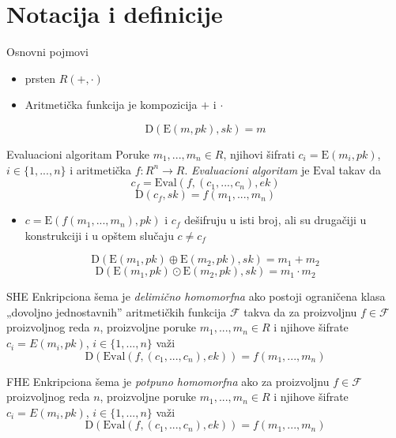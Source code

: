 \documentclass[aspectratio=1610]{beamer}
\begin{document}
\section{Notacija i definicije}
\begin{frame}{Osnovni pojmovi}
    \begin{itemize}
        \item prsten $R(+, \cdot)$
        \item Aritmeti\v cka funkcija je kompozicija $+$ i $\cdot$
    \end{itemize}
    $$\mathrm{D}(\mathrm{E}(m, pk), sk) = m $$
    \begin{pblock}{Evaluacioni algoritam}
        Poruke $m_1, ..., m_n\in R$, njihovi \v sifrati $c_i = \mathrm{E}(m_i, pk)$, $i\in \{1, ..., n\}$ i aritmeti\v cka $f:R^n\rightarrow R$. \textit{Evaluacioni algoritam} je $\mathrm{Eval}$ takav da
        $$c_f = \mathrm{Eval}(f, (c_1, ..., c_n), ek)$$
        $$\mathrm{D}(c_f, sk) = f(m_1, ..., m_n)$$
    \end{pblock}
    \begin{itemize}
        \item $c = \mathrm{E}(f (m_1 , ..., m_n ), pk)$ i $c_f$ dešifruju u isti broj, ali su drugačiji u konstrukciji i u opštem slučaju $c \neq c_f$
    \end{itemize}
\end{frame}

\begin{frame}
    $$\mathrm{D}(\mathrm{E}(m_1, pk) \oplus \mathrm{E}(m_2, pk), sk) = m_1 + m_2$$
    $$\mathrm{D}(\mathrm{E}(m_1, pk) \odot \mathrm{E}(m_2, pk), sk) = m_1 \cdot m_2$$
    \begin{pblock}{SHE}
        Enkripciona \v sema je \textit{delimi\v cno homomorfna} ako postoji ograni\v cena klasa „dovoljno jednostavnih” aritmeti\v ckih funkcija $\mathcal{F}$ takva da za proizvoljnu $f\in \mathcal{F}$ proizvoljnog reda $n$, proizvoljne poruke $m_1, ..., m_n\in R$ i njihove \v sifrate $c_i = E(m_i, pk)$, $i\in \{1, ..., n\}$ va\v zi
    $$\mathrm{D}(\mathrm{Eval}(f, (c_1, ..., c_n), ek)) = f(m_1, ..., m_n)$$
    \end{pblock}
\end{frame}

\begin{frame}
    \begin{pblock}{FHE}
        Enkripciona \v sema je \textit{potpuno homomorfna} ako za proizvoljnu $f\in \mathcal{F}$ proizvoljnog reda $n$, proizvoljne poruke $m_1, ..., m_n\in R$ i njihove \v sifrate $c_i = E(m_i, pk)$, $i\in \{1, ..., n\}$ va\v zi
        $$\mathrm{D}(\mathrm{Eval}(f, (c_1, ..., c_n), ek)) = f(m_1, ..., m_n)$$
    \end{pblock}
\end{frame}
\end{document}
